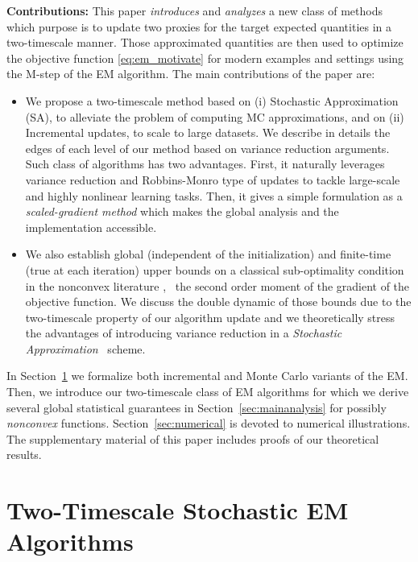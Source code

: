 \documentclass[11pt]{article}
\theoremstyle{t}
\begin{document}
\textbf{Contributions:} This paper \textit{introduces} and \textit{analyzes} a new class of methods which purpose is to update two proxies for the target expected quantities in a two-timescale manner. 
Those approximated quantities are then used to optimize the objective function \eqref{eq:em_motivate} for modern examples and settings using the \textsf{M-step} of the EM algorithm.
The main contributions of the paper are:
\begin{itemize}
\item We propose a two-timescale method based on \textsf{(i)} Stochastic Approximation (SA), to alleviate the problem of computing MC approximations, and on \textsf{(ii)} Incremental updates, to scale to large datasets. We describe in details the edges of each level of our method based on variance reduction arguments. Such class of algorithms has two advantages. First, it naturally leverages variance reduction and Robbins-Monro type of updates to tackle large-scale and highly nonlinear learning tasks. Then, it gives a simple formulation as a \textit{scaled-gradient method} which makes the global analysis and the implementation accessible.
\item We also establish global (independent of the initialization) and finite-time (true at each iteration) upper bounds on a classical sub-optimality condition in the nonconvex literature \citep{jain2017non, ghadimi2013stochastic}, \ie\ the second order moment of the gradient of the objective function. 
We discuss the double dynamic of those bounds due to the two-timescale property of our algorithm update and we theoretically stress the advantages of introducing variance reduction in a \emph{Stochastic Approximation}~\citep{robbins1951stochastic} scheme.

\end{itemize}

In Section~\ref{sec:tts} we formalize both incremental and Monte Carlo variants of the EM. Then, we introduce our two-timescale class of EM algorithms for which we derive several global statistical guarantees in Section~\ref{sec:mainanalysis} for possibly \textit{nonconvex} functions.
Section~\ref{sec:numerical} is devoted to numerical illustrations.
The supplementary material of this paper includes proofs of  our theoretical results.

\vspace{-0.05in}
\section{Two-Timescale Stochastic EM Algorithms}\label{sec:tts}
\vspace{-0.05in}
\end{document}
